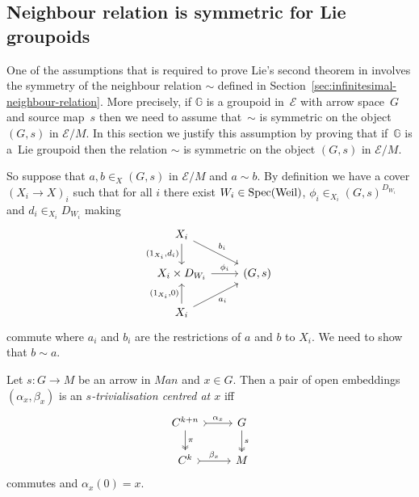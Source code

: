 \documentclass[10pt,a4paper]{amsart}
\numberwithin{equation}{section}
\begin{document}
\subsection{Neighbour relation is symmetric for Lie groupoids}\label{sec:symmetry-of-neigbour-relation}

One of the assumptions that is required to prove Lie's second theorem in \cite{burke-relative-to-local-models} involves the symmetry of the neighbour relation $\sim$ def\/ined in Section~\ref{sec:infinitesimal-neighbour-relation}. More precisely, if $\mathbb{G}$ is a groupoid in~$\mathcal{E}$ with arrow space~$G$ and source map~$s$ then we need to assume that~$\sim$ is symmetric on the object~$(G,s)$ in $\mathcal{E}/M$. In this section we justify this assumption by proving that if~$\mathbb{G}$ is a~Lie groupoid then the relation $\sim$ is symmetric on the object $(G,s)$ in $\mathcal{E}/M$.

So suppose that $a,b\in_X(G,s)$ in $\mathcal{E}/M$ and $a\sim b$. By def\/inition we have a cover $(X_i \rightarrow X)_i$ such that for all $i$ there exist $W_i\in {\rm Spec}({\rm Weil})$, $\phi_i\in_{X_i}(G,s)^{D_{W_i}}$ and $d_i\in_{X_i}D_{W_i}$ making
\begin{equation*}
\begin{tikzcd}
 X_i \dar[swap]{(1_{X_i},d_i)} \drar{b_i} {}\\
 X_i\times D_{W_i} \rar{\phi_i} & (G,s)\\
 X_i \uar{(1_{X_i},0)} \urar[swap]{a_i} & {}
\end{tikzcd}
\end{equation*}
commute where $a_i$ and $b_i$ are the restrictions of $a$ and $b$ to $X_i$. We need to show that $b\sim a$.

\begin{Definition}\label{definition:s-trivialisation}
Let $s\colon G\rightarrow M$ be an arrow in $Man$ and $x\in G$. Then a pair of open embeddings $(\alpha_{x},\beta_{x})$ is an \emph{$s$-trivialisation centred at $x$} if\/f
\begin{equation*}\begin{tikzcd}
C^{k+n} \dar[twoheadrightarrow]{\pi} \rar[rightarrowtail]{\alpha_{x}} & G \dar[twoheadrightarrow]{s} \\
C^{k} \rar[rightarrowtail]{\beta_{x}} & M
\end{tikzcd}\end{equation*}
commutes and $\alpha_{x}(0)=x$.
\end{Definition}
\end{document}
